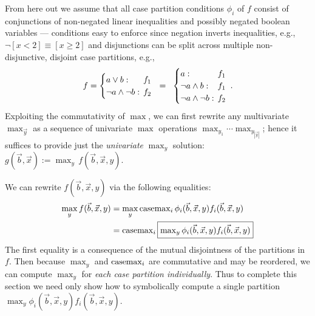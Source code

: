 From here out we assume that all case partition conditions $\phi_i$ of
$f$ consist of conjunctions of non-negated linear inequalities and
possibly negated boolean variables --- conditions easy to enforce
since 
negation
inverts inequalities, e.g., $\neg [x < 2] \equiv [x \geq 2]$
and disjunctions can be split across multiple non-disjunctive, 
disjoint case partitions, e.g., {\footnotesize
\begin{equation*}
f = 
\begin{cases}
a \lor b: & \sqm f_1 \\ 
\neg a \land \neg b: & \sqm f_2\\ 
\end{cases} 
\; \; =  \; \;
\begin{cases}
a: & \sqm f_1 \\ 
\neg a \land b: & \sqm f_1 \\ 
\neg a \land \neg b: & \sqm f_2\\ 
\end{cases} \; .
\end{equation*}}
\hspace{2mm} Exploiting the commutativity of $\max$, we can first
rewrite any multivariate $\max_{\vec{y}}$ as a sequence of univariate
$\max$ operations $\max_{y_1} \cdots \max_{y_{|\vec{y}|}}$; hence it
suffices to provide just the \emph{univariate} $\max_y$ solution:
$g(\vec{b},\vec{x}) := \max_{y} \, f(\vec{b},\vec{x},y)$.

We can rewrite $f(\vec{b},\vec{x},y)$ via 
the following equalities:
{\footnotesize
\begin{align}
\max_y f(\vec{b},\vec{x},y) & = 
\max_y \mathrm{casemax}_i \, \phi_i(\vec{b},\vec{x},y) f_i(\vec{b},\vec{x},y) \nonumber \\
& = \mathrm{casemax}_i \, \fbox{$\max_y \phi_i(\vec{b},\vec{x},y) f_i(\vec{b},\vec{x},y)$} \label{eq:casemax_max}
\end{align}}
The first equality is a consequence of the mutual 
disjointness of the partitions in $f$.  Then because 
$\max_y$ and $\mathrm{casemax}_i$ are commutative and may be reordered,
we can compute $\max_y$ for \emph{each case partition
individually}.  Thus to complete this section we need only
show how to symbolically compute a single partition 
$\max_y \phi_i(\vec{b},\vec{x},y) f_i(\vec{b},\vec{x},y)$.

